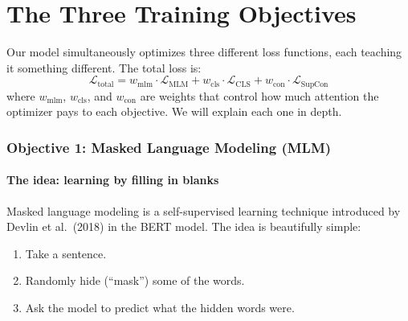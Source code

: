 \documentclass[11pt,a4paper]{article}
\theoremstyle{definition}
\begin{document}
\newpage
\part{The Three Training Objectives}

Our model simultaneously optimizes three different loss functions,
each teaching it something different. The total loss is:
\[
\mathcal{L}_{\text{total}}
= w_{\text{mlm}} \cdot \mathcal{L}_{\text{MLM}}
+ w_{\text{cls}} \cdot \mathcal{L}_{\text{CLS}}
+ w_{\text{con}} \cdot \mathcal{L}_{\text{SupCon}}
\]
where $w_{\text{mlm}}$, $w_{\text{cls}}$, and $w_{\text{con}}$ are
weights that control how much attention the optimizer pays to each
objective. We will explain each one in depth.

\section{Objective 1: Masked Language Modeling (MLM)}
\label{sec:mlm}

\subsection{The idea: learning by filling in blanks}

Masked language modeling is a self-supervised learning technique
introduced by Devlin et al.\ (2018) in the BERT model. The idea is
beautifully simple:

\begin{enumerate}[nosep]
  \item Take a sentence.
  \item Randomly hide (``mask'') some of the words.
  \item Ask the model to predict what the hidden words were.
\end{enumerate}

\begin{center}
\end{center}
\end{document}

